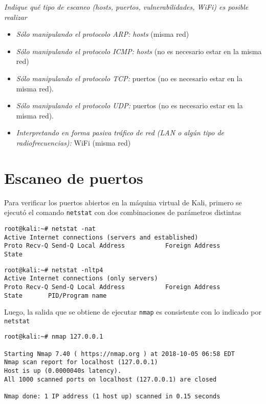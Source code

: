 \emph{Indique qué tipo de escaneo (hosts, puertos, vulnerabilidades, WiFi) es posible realizar}

\begin{itemize}
    \item \emph{Sólo manipulando el protocolo ARP:} \emph{hosts} (misma red)
    \item \emph{Sólo manipulando el protocolo ICMP:} \emph{hosts} (no es necesario estar en la misma red)
    \item \emph{Sólo manipulando el protocolo TCP:} puertos (no es necesario estar en la misma red).
    \item \emph{Sólo manipulando el protocolo UDP:} puertos (no es necesario estar en la misma red).
    \item \emph{Interpretando en forma pasiva tráfico de red (LAN o algún tipo de radiofrecuencias):} WiFi (misma red)
\end{itemize}

\section{Escaneo de puertos}

Para verificar los puertos abiertos en la máquina virtual de Kali, primero se ejecutó el comando \texttt{netstat} con dos combinaciones de parámetros distintas 

\begin{lstlisting}[title={Ningún puerto abierto}]
root@kali:~# netstat -nat
Active Internet connections (servers and established)
Proto Recv-Q Send-Q Local Address           Foreign Address         State
\end{lstlisting}

\begin{lstlisting}[title={Ningún puerto abierto}]
root@kali:~# netstat -nltp4
Active Internet connections (only servers)
Proto Recv-Q Send-Q Local Address           Foreign Address         State       PID/Program name
\end{lstlisting}

Luego, la salida que se obtiene de ejecutar \texttt{nmap} es consistente con lo indicado por \texttt{netstat}  

\begin{lstlisting}
root@kali:~# nmap 127.0.0.1

Starting Nmap 7.40 ( https://nmap.org ) at 2018-10-05 06:58 EDT
Nmap scan report for localhost (127.0.0.1)
Host is up (0.0000040s latency).
All 1000 scanned ports on localhost (127.0.0.1) are closed

Nmap done: 1 IP address (1 host up) scanned in 0.15 seconds
\end{lstlisting}

